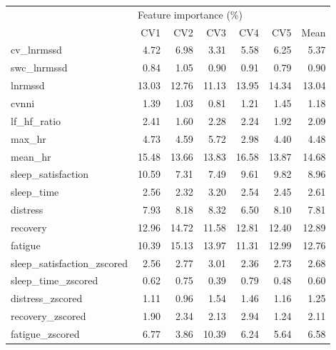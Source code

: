 \begin{tabular}{lrrrrrr}
\toprule
{} & \multicolumn{6}{l}{Feature importance (\%)} \\
{} &                    CV1 &    CV2 &    CV3 &    CV4 &    CV5 &   Mean \\
\midrule
cv\_lnrmssd                 &                   4.72 &   6.98 &   3.31 &   5.58 &   6.25 &   5.37 \\
swc\_lnrmssd                &                   0.84 &   1.05 &   0.90 &   0.91 &   0.79 &   0.90 \\
lnrmssd                    &                  13.03 &  12.76 &  11.13 &  13.95 &  14.34 &  13.04 \\
cvnni                      &                   1.39 &   1.03 &   0.81 &   1.21 &   1.45 &   1.18 \\
lf\_hf\_ratio                &                   2.41 &   1.60 &   2.28 &   2.24 &   1.92 &   2.09 \\
max\_hr                     &                   4.73 &   4.59 &   5.72 &   2.98 &   4.40 &   4.48 \\
mean\_hr                    &                  15.48 &  13.66 &  13.83 &  16.58 &  13.87 &  14.68 \\
sleep\_satisfaction         &                  10.59 &   7.31 &   7.49 &   9.61 &   9.82 &   8.96 \\
sleep\_time                 &                   2.56 &   2.32 &   3.20 &   2.54 &   2.45 &   2.61 \\
distress                   &                   7.93 &   8.18 &   8.32 &   6.50 &   8.10 &   7.81 \\
recovery                   &                  12.96 &  14.72 &  11.58 &  12.81 &  12.40 &  12.89 \\
fatigue                    &                  10.39 &  15.13 &  13.97 &  11.31 &  12.99 &  12.76 \\
sleep\_satisfaction\_zscored &                   2.56 &   2.77 &   3.01 &   2.36 &   2.73 &   2.68 \\
sleep\_time\_zscored         &                   0.62 &   0.75 &   0.39 &   0.79 &   0.48 &   0.60 \\
distress\_zscored           &                   1.11 &   0.96 &   1.54 &   1.46 &   1.16 &   1.25 \\
recovery\_zscored           &                   1.90 &   2.34 &   2.13 &   2.94 &   1.24 &   2.11 \\
fatigue\_zscored            &                   6.77 &   3.86 &  10.39 &   6.24 &   5.64 &   6.58 \\
\bottomrule
\end{tabular}
